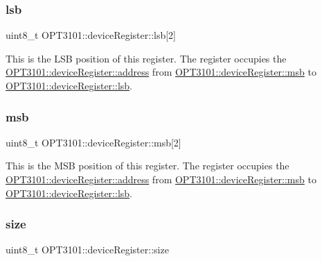 \subsubsection{\texorpdfstring{lsb}{lsb}}
{\footnotesize\ttfamily uint8\+\_\+t O\+P\+T3101\+::device\+Register\+::lsb\mbox{[}2\mbox{]}}



This is the L\+SB position of this register. The register occupies the \mbox{\hyperlink{class_o_p_t3101_1_1device_register_a81d25c717489ac388db0fed33c35bedd}{O\+P\+T3101\+::device\+Register\+::address}} from \mbox{\hyperlink{class_o_p_t3101_1_1device_register_a40f9e71d804ae858b6baed1f12b3cf83}{O\+P\+T3101\+::device\+Register\+::msb}} to \mbox{\hyperlink{class_o_p_t3101_1_1device_register_a404078f369116e10b1cccfbb77c557ca}{O\+P\+T3101\+::device\+Register\+::lsb}}. 

\mbox{\label{class_o_p_t3101_1_1device_register_a40f9e71d804ae858b6baed1f12b3cf83}} 
\subsubsection{\texorpdfstring{msb}{msb}}
{\footnotesize\ttfamily uint8\+\_\+t O\+P\+T3101\+::device\+Register\+::msb\mbox{[}2\mbox{]}}



This is the M\+SB position of this register. The register occupies the \mbox{\hyperlink{class_o_p_t3101_1_1device_register_a81d25c717489ac388db0fed33c35bedd}{O\+P\+T3101\+::device\+Register\+::address}} from \mbox{\hyperlink{class_o_p_t3101_1_1device_register_a40f9e71d804ae858b6baed1f12b3cf83}{O\+P\+T3101\+::device\+Register\+::msb}} to \mbox{\hyperlink{class_o_p_t3101_1_1device_register_a404078f369116e10b1cccfbb77c557ca}{O\+P\+T3101\+::device\+Register\+::lsb}}. 

\mbox{\label{class_o_p_t3101_1_1device_register_a058d48b4c23e22739b1c65d85367a0a8}} 
\subsubsection{\texorpdfstring{size}{size}}
{\footnotesize\ttfamily uint8\+\_\+t O\+P\+T3101\+::device\+Register\+::size}



